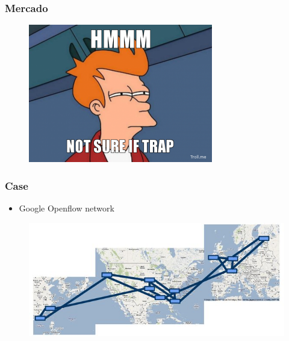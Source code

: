 %
%
\begin{frame}\frametitle{Mercado}

    	\begin{figure}[h]
        \centering
        \includegraphics[scale=0.6]{images/trap.jpg}
    \end{figure}
\end{frame}


%
%
\begin{frame}\frametitle{Case}
    \begin{itemize}
    \item Google Openflow network
    \end{itemize}
	\begin{figure}[h]\hspace*{-0.5cm}
        \centering
        \includegraphics[scale=0.5]{images/google-sdn.jpg}
    \end{figure}
\end{frame}
